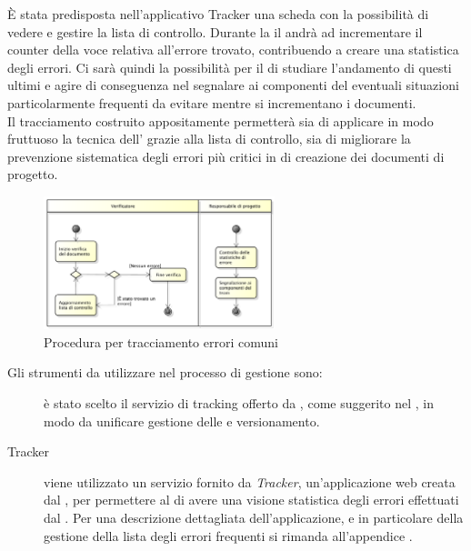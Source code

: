 				\label{sec:tracciamento}
					È stata predisposta nell'applicativo Tracker una scheda con la possibilità di vedere e gestire la lista di controllo. Durante la  il  andrà ad incrementare il counter della voce relativa all'errore trovato, contribuendo a creare una statistica degli errori. Ci sarà quindi la possibilità per il  di studiare l'andamento di questi ultimi e agire di conseguenza nel segnalare ai componenti del  eventuali situazioni particolarmente frequenti da evitare mentre si incrementano i documenti.\\ Il tracciamento costruito appositamente permetterà sia di applicare in modo fruttuoso la tecnica dell'\textit{} grazie alla lista di controllo, sia di migliorare la prevenzione sistematica degli errori più critici in  di creazione dei documenti di progetto.
					\begin{figure}[H]
							\centering
							\includegraphics[width=0.6\textwidth]{NormeDiProgetto/Pics/ProceduraDecrementoErrori}
							\caption{Procedura per tracciamento errori comuni}
					\end{figure}
			Gli strumenti da utilizzare nel processo di gestione sono:
			\begin{description}
				\item[] è stato scelto il servizio di  tracking offerto da , come suggerito nel , in modo da unificare gestione delle  e versionamento.
				\item[Tracker] viene utilizzato un servizio fornito da \textit{Tracker}, un'applicazione web creata dal \groupname, per permettere al  di avere una visione statistica degli errori effettuati dal . Per una descrizione dettagliata dell'applicazione, e in particolare della gestione della lista degli errori frequenti si rimanda all'appendice .
			\end{description}
			
			
